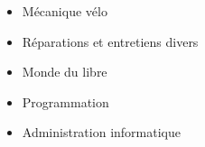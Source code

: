 \documentclass[10pt,a4paper,ragged2e,withhyper,normalphoto]{altacv}
\begin{document}
\begin{paracol}{2}
\begin{itemize}
	\item Mécanique vélo
	\item Réparations et entretiens divers
\end{itemize}

\begin{itemize}
	\item Monde du libre
	\item Programmation
	\item Administration informatique
\end{itemize}
	
\newpage

\end{paracol}
\end{document}
